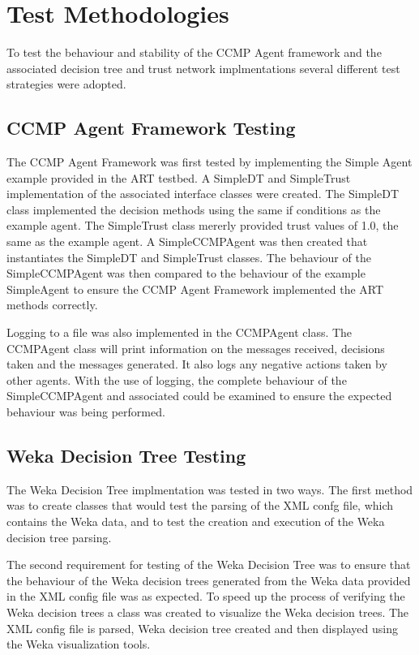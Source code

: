 \section{Test Methodologies}
To test the behaviour and stability of the CCMP Agent framework and the
associated decision tree and trust network implmentations several different test
strategies were adopted.

\subsection{CCMP Agent Framework Testing}
The CCMP Agent Framework was first tested by implementing the
Simple Agent example provided in the ART testbed.  A SimpleDT and
SimpleTrust implementation of the associated interface classes were created.
The SimpleDT class implemented the decision methods using the same if conditions
as the example agent.  The SimpleTrust class mererly provided trust values of
1.0, the same as the example agent.  A SimpleCCMPAgent was then created that
instantiates the SimpleDT and SimpleTrust classes.  The behaviour of the
SimpleCCMPAgent was then compared to the behaviour of the example SimpleAgent
to ensure the CCMP Agent Framework implemented the ART methods correctly.

Logging to a file was also implemented in the CCMPAgent class.  The CCMPAgent
class will print information on the messages received, decisions taken and the
messages generated.  It also logs any negative actions taken by other agents.
With the use of logging, the complete behaviour of the SimpleCCMPAgent and
associated  could be examined to ensure the expected behaviour was being
performed.

\subsection{Weka Decision Tree Testing}
The Weka Decision Tree implmentation was tested in two ways.  The first
method was to create classes that would test the parsing of the XML confg
file, which contains the Weka data, and to test the creation and execution of
the Weka decision tree parsing.

The second requirement for testing of the Weka Decision Tree was to ensure
that the behaviour of the Weka decision trees generated from the Weka data
provided in the XML config file was as expected.  To speed up the process of
verifying the Weka decision trees a class was created to visualize the Weka
decision trees.  The XML config file is parsed, Weka decision tree created and
then displayed using the Weka visualization tools.

